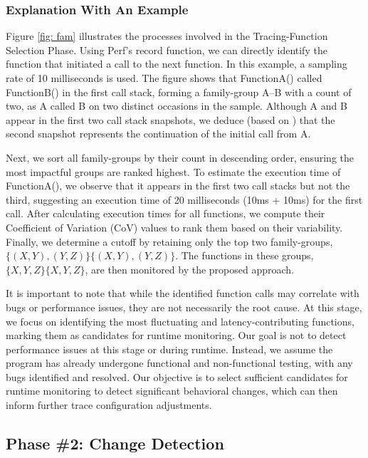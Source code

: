 \documentclass[pdflatex,sn-nature]{sn-jnl}%
\theoremstyle{thmstyleone}%
\theoremstyle{thmstyletwo}%
\theoremstyle{thmstylethree}%
\begin{document}
\subsubsection{Explanation With An Example}
Figure \ref{fig: fam} illustrates the processes involved in the Tracing-Function Selection Phase. Using Perf's record function, we can directly identify the function that initiated a call to the next function. In this example, a sampling rate of 10 milliseconds is used. The figure shows that FunctionA() called FunctionB() in the first call stack, forming a family-group A--B with a count of two, as A called B on two distinct occasions in the sample. Although A and B appear in the first two call stack snapshots, we deduce (based on \cite{han2012performance}) that the second snapshot represents the continuation of the initial call from A.

Next, we sort all family-groups by their count in descending order, ensuring the most impactful groups are ranked highest. To estimate the execution time of FunctionA(), we observe that it appears in the first two call stacks but not the third, suggesting an execution time of 20 milliseconds (10ms + 10ms) for the first call. After calculating execution times for all functions, we compute their Coefficient of Variation (CoV) values to rank them based on their variability. Finally, we determine a cutoff by retaining only the top two family-groups, $\{(X,Y),(Y,Z)\}\{(X,Y),(Y,Z)\}$. The functions in these groups, $\{X,Y,Z\}\{X,Y,Z\}$, are then monitored by the proposed approach.

It is important to note that while the identified function calls may correlate with bugs or performance issues, they are not necessarily the root cause. At this stage, we focus on identifying the most fluctuating and latency-contributing functions, marking them as candidates for runtime monitoring. Our goal is not to detect performance issues at this stage or during runtime. Instead, we assume the program has already undergone functional and non-functional testing, with any bugs identified and resolved. Our objective is to select sufficient candidates for runtime monitoring to detect significant behavioral changes, which can then inform further trace configuration adjustments.


\subsection{Phase \#2: Change Detection}
\end{document}
